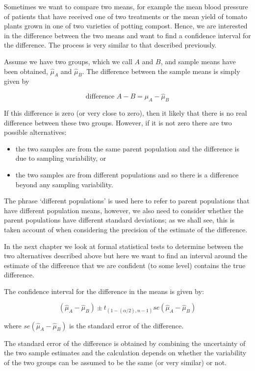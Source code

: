 \documentclass[
  oneside]{krantz}
\providecommand{\tightlist}{%
  \setlength{\itemsep}{0pt}\setlength{\parskip}{0pt}}
\begin{document}
Sometimes we want to compare two means, for example the mean blood pressure of patients that have received one of two treatments or the mean yield of tomato plants grown in one of two varieties of potting compost. Hence, we are interested in the difference between the two means and want to find a confidence interval for the difference. The process is very similar to that described previously.

Assume we have two groups, which we call \(A\) and \(B\), and sample means have been obtained, \(\hat \mu_A\) and \(\hat \mu_B\). The difference between the sample means is simply given by

\[\textrm{difference } A - B = \hat \mu_A - \hat \mu_B\]

If this difference is zero (or very close to zero), then it likely that there is no real difference between these two groups. However, if it is not zero there are two possible alternatives:

\begin{itemize}
\tightlist
\item
  the two samples are from the same parent population and the difference is due to sampling variability, or
\item
  the two samples are from different populations and so there is a difference beyond any sampling variability.
\end{itemize}

The phrase `different populations' is used here to refer to parent populations that have different population means, however, we also need to consider whether the parent populations have different standard deviations; as we shall see, this is taken account of when considering the precision of the estimate of the difference.

In the next chapter we look at formal statistical tests to determine between the two alternatives described above but here we want to find an interval around the estimate of the difference that we are confident (to some level) contains the true difference.

The confidence interval for the difference in the means is given by:

\[(\hat \mu_A - \hat \mu_B) \pm t_{(1-(\alpha/2), n-1)}se(\hat \mu_A - \hat \mu_B)\]

where \(se(\hat \mu_A - \hat \mu_B)\) is the standard error of the difference.

The standard error of the difference is obtained by combining the uncertainty of the two sample estimates and the calculation depends on whether the variability of the two groups can be assumed to be the same (or very similar) or not.
\end{document}
